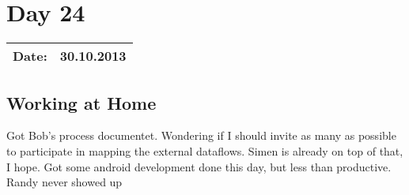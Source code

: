 \section{Day 24}
\begin{tabular}{|c|c|}
\hline
Date: & 30.10.2013 \\
\hline
\end{tabular}
\subsection{Working at Home}
Got Bob's process documentet. Wondering if I should invite as many as possible to participate in mapping the external dataflows. Simen is already on top of that, I hope. 
Got some android development done this day, but less than productive. Randy never showed up

